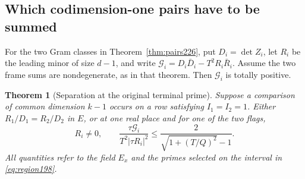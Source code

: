 \documentclass[a4paper,11pt]{article}
\newtheorem{theorem}[proposition]{Theorem}
\theoremstyle{definition}
\theoremstyle{remark}
\numberwithin{equation}{section}
\begin{document}
\subsection{Which codimension-one pairs have to be summed}\label{nav:IX-29}
For the two Gram classes in Theorem~\ref{thm:pairs226}, put
\(D_i=\det Z_i\), let \(R_i\) be the leading minor of size
\(d-1\), and write \(\mathcal G_i=D_i\bar D_i-T^2R_i\bar R_i\).
Assume the two frame sums are nondegenerate, as in that
theorem. Then \(\mathcal G_i\) is totally positive.

\begin{theorem}[Separation at the original terminal prime]
\label{thm:normal228}
Suppose a comparison of common dimension \(k-1\) occurs
on a row satisfying \(I_1=I_2=1\). Either \(R_1/D_1=R_2/D_2\)
in \(E\), or at one real place and for one of the two flags,
\[
     R_i\ne0,\qquad
     \frac{\tau\mathcal G_i}{T^2|\tau R_i|^2}
                  \le \frac{2}{\sqrt{1+(T/Q)^2}-1}.
\]
All quantities refer to the field \(E_x\) and the primes
selected on the interval in \eqref{eq:region198}.
\end{theorem}
\end{document}
